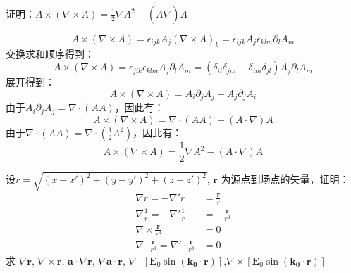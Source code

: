 \documentclass{assignment}
\begin{document}
    \begin{prob}
    证明：$A \times (\nabla \times A) = \frac{1}{2} \nabla A^2 -(A \dot \nabla)A$
    \end{prob}
    \begin{sol}
    \begin{equation}
        A \times (\nabla \times A) = \epsilon_{ijk}A_j(\nabla \times A)_k = \epsilon_{ijk}A_j\epsilon_{klm}\partial_l A_m
    \end{equation}
    交换求和顺序得到：
    \begin{equation}
        A \times (\nabla \times A) = \epsilon_{jik}\epsilon_{klm}A_j\partial_l A_m = (\delta_{il}\delta_{jm} - \delta_{im}\delta_{jl})A_j\partial_l A_m
    \end{equation}
    展开得到：
    \begin{equation}
        A \times (\nabla \times A) = A_i\partial_j A_j - A_j\partial_j A_i
    \end{equation}
    由于$A_i\partial_j A_j = \nabla \cdot (A A)$，因此有：
    \begin{equation}
        A \times (\nabla \times A) = \nabla \cdot (A A) - (A \cdot \nabla)A
    \end{equation}
    由于$\nabla \cdot (A A) = \nabla \cdot \left(\frac{1}{2}A^2\right)$，因此有：
    \begin{equation}
        A \times (\nabla \times A) = \frac{1}{2}\nabla A^2 - (A \cdot \nabla)A
    \end{equation}

    \end{sol}
    \begin{prob}
        设$r = \sqrt{(x-x')^2+(y-y')^2+(z-z')^2}$, $\mathbf{r}$ 为源点到场点的矢量，证明：
        \[
            \begin{aligned}
            \nabla r = -\nabla ' r &= \frac{\mathbf{r}}{r}\\
            \nabla \frac{1}{r} = -\nabla ' \frac{1}{r} &= -\frac{\mathbf{r}}{r^3}\\
            \nabla \times \frac{\mathbf{r}}{r^3} &= 0 \\
            \nabla \cdot \frac{\mathbf{r}}{r^3} = \nabla ' \cdot \frac{\mathbf{r}}{r^3} &= 0
            \end{aligned}
        \]
        求 $\nabla \mathbf{r}$, $\nabla \times \mathbf{r}$, $\mathbf{a} \cdot \nabla \mathbf{r}$, $\nabla \mathbf{a} \cdot \mathbf{r}$, $\nabla \cdot [ \mathbf{E}_0 \sin{(\mathbf{k_0} \cdot \mathbf{r})}]$,$\nabla \times [ \mathbf{E}_0 \sin{(\mathbf{k_0} \cdot \mathbf{r})}]$
    \end{prob}
\end{document}

